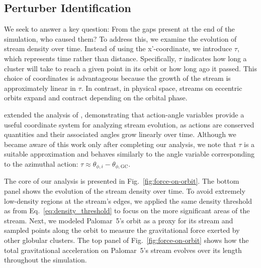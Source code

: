 \documentclass{aa}
\begin{document}
\begin{appendix}
  \section{Perturber Identification} \label{sec:Perturber_Identification}

    We seek to answer a key question: From the gaps present at the end of the simulation, who caused them? To address this, we examine the evolution of stream density over time. Instead of using the x'-coordinate, we introduce $\tau$, which represents time rather than distance. Specifically, $\tau$ indicates how long a cluster will take to reach a given point in its orbit or how long ago it passed. This choice of coordinates is advantageous because the growth of the stream is approximately linear in $\tau$. In contrast, in physical space, streams on eccentric orbits expand and contract depending on the orbital phase.


    \citet{2016MNRAS.457.3817S} extended the analysis of \citet{2015MNRAS.450.1136E}, demonstrating that action-angle variables provide a useful coordinate system for analyzing stream evolution, as actions are conserved quantities and their associated angles grow linearly over time. Although we became aware of this work only after completing our analysis, we note that $\tau$ is a suitable approximation and behaves similarly to the angle variable corresponding to the azimuthal action: $\tau \approx \theta_{\phi, i} - \theta_{\phi,\text{GC}}$.

    The core of our analysis is presented in Fig.~\ref{fig:force-on-orbit}. The bottom panel shows the evolution of the stream density over time. To avoid extremely low-density regions at the stream's edges, we applied the same density threshold as from Eq.~\ref{eq:density_threshold} to focus on the more significant areas of the stream. Next, we modeled Palomar~5's orbit as a proxy for its stream and sampled points along the orbit to measure the gravitational force exerted by other globular clusters. The top panel of Fig.~\ref{fig:force-on-orbit} shows how the total gravitational acceleration on Palomar~5's stream evolves over its length throughout the simulation.


\end{appendix}
\end{document}
